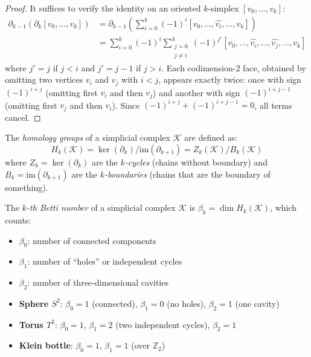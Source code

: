 \begin{proof}
	It suffices to verify the identity on an oriented $k$-simplex $[v_0, \ldots, v_k]$:
	\begin{align*}
		\partial_{k-1}(\partial_k [v_0, \ldots, v_k]) &= \partial_{k-1}\!\left(\sum_{i=0}^{k} (-1)^i [v_0, \ldots, \widehat{v_i}, \ldots, v_k]\right) \\
		&= \sum_{i=0}^{k} (-1)^i \sum_{\substack{j=0 \\ j \neq i}}^{k} (-1)^{j'} [v_0, \ldots, \widehat{v_i}, \ldots, \widehat{v_j}, \ldots, v_k]
	\end{align*}
	where $j' = j$ if $j < i$ and $j' = j-1$ if $j > i$. Each codimension-2 face, obtained by omitting two vertices $v_i$ and $v_j$ with $i < j$, appears exactly twice: once with sign $(-1)^{i+j}$ (omitting first $v_i$ and then $v_j$) and another with sign $(-1)^{i+j-1}$ (omitting first $v_j$ and then $v_i$). Since $(-1)^{i+j} + (-1)^{i+j-1} = 0$, all terms cancel.
\end{proof}

\begin{definition}\label{def:homologia_betti}
	The \textit{homology groups} of a simplicial complex $\mathcal{K}$ are defined as:
	\[
		H_k(\mathcal{K}) = \ker(\partial_k) / \mathrm{im}(\partial_{k+1}) = Z_k(\mathcal{K}) / B_k(\mathcal{K})
	\]
	where $Z_k = \ker(\partial_k)$ are the \textit{$k$-cycles} (chains without boundary) and $B_k = \mathrm{im}(\partial_{k+1})$ are the \textit{$k$-boundaries} (chains that are the boundary of something).
\end{definition}

\begin{definition}\label{def:numeros_betti_gdl}
	The \textit{$k$-th Betti number} of a simplicial complex $\mathcal{K}$ is $\beta_k = \dim H_k(\mathcal{K})$, which counts:
	\begin{itemize}
		\item $\beta_0$: number of connected components
		\item $\beta_1$: number of ``holes'' or independent cycles
		\item $\beta_2$: number of three-dimensional cavities
	\end{itemize}
\end{definition}

\begin{example}\label{ex:betti_superficies}
\leavevmode
	\begin{itemize}
		\item \textbf{Sphere $S^2$}: $\beta_0 = 1$ (connected), $\beta_1 = 0$ (no holes), $\beta_2 = 1$ (one cavity)
		\item \textbf{Torus $T^2$}: $\beta_0 = 1$, $\beta_1 = 2$ (two independent cycles), $\beta_2 = 1$
		\item \textbf{Klein bottle}: $\beta_0 = 1$, $\beta_1 = 1$ (over $\mathbb{Z}_2$)
	\end{itemize}
\end{example}

